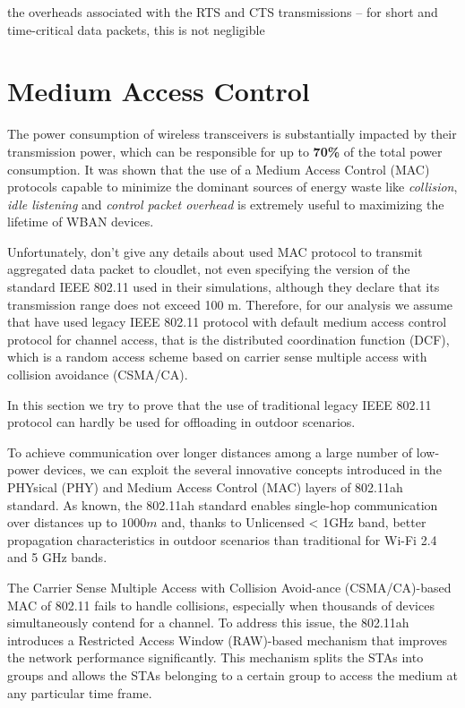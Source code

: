 \documentclass[sigchi]{acmart}
\begin{document}
the overheads associated with
the RTS and CTS transmissions – for short and time-critical data packets, this is not negligible 


\section{Medium Access Control}

The power consumption of wireless transceivers is substantially impacted by their transmission power, which can be responsible for up to \textbf{70\%} of the total power consumption. It was shown that the use of a Medium Access Control (MAC) protocols capable to minimize the dominant sources of energy waste like \textit{collision}, \textit{idle listening} and \textit{control packet overhead} is extremely useful to maximizing the lifetime of WBAN devices.

Unfortunately, \citet{MSAReport} don't give any details about used MAC protocol to transmit aggregated data packet to cloudlet, not even specifying the version of the standard IEEE 802.11 used in their simulations, although they declare that its transmission range does not exceed 100 m. Therefore, for our analysis we assume that \citet{MSAReport} have used legacy IEEE 802.11 protocol with default medium access control protocol for channel access, that is the distributed coordination function (DCF), which is a random access scheme based on carrier sense multiple access with collision avoidance (CSMA/CA).

In this section we try to prove that the use of traditional legacy IEEE 802.11 protocol can hardly be used for offloading in outdoor scenarios.

To achieve communication over longer distances among a large number of low-power devices, we can exploit the several innovative concepts introduced in the PHYsical (PHY) and Medium Access Control (MAC) layers of 802.11ah standard. As known, the 802.11ah standard enables single-hop communication over distances up to $1000 m$ and, thanks to Unlicensed < 1GHz band, better propagation characteristics in outdoor scenarios than traditional for Wi-Fi 2.4 and 5 GHz bands.

The Carrier Sense Multiple Access with Collision Avoid-ance (CSMA/CA)-based MAC of 802.11 fails to handle collisions, especially when thousands of devices simultaneously contend for a channel. To address this issue, the 802.11ah introduces a Restricted Access Window (RAW)-based mechanism that improves the network performance significantly. This mechanism splits the STAs into groups and allows the STAs belonging to a certain group to access the medium at any particular time frame.
\end{document}
